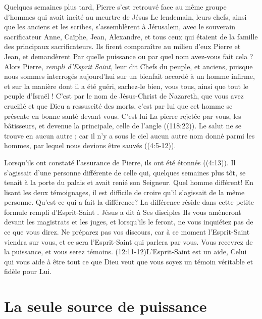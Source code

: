 Quelques semaines plus tard, Pierre s'est retrouvé face au même groupe
 d'hommes qui avait incité au meurtre de Jésus\frcolon{}
 \Og Le lendemain, leurs chefs, ainsi que les anciens et les scribes,
 s'assemblèrent à Jérusalem, avec le souverain sacrificateur Anne,
 Caïphe, Jean, Ale\-xandre, et tous ceux qui étaient de la famille
 des principaux sacrificateurs. Ils firent comparaître au milieu d'eux
 Pierre et Jean, et demandèrent\frcolon{} Par quelle puissance ou par quel nom
 avez-vous fait cela ? Alors Pierre, \emph{rempli d'Esprit Saint}, leur dit\frcolon{}
 Chefs du peuple, et anciens, puisque nous sommes interrogés aujourd'hui
 sur un bienfait accordé à un homme infirme, et sur la manière
 dont il a été guéri, sachez-le bien, vous tous, ainsi que tout le peuple
 d'Israël ! C'est par le nom de Jésus-Christ de Nazareth, que vous avez
 crucifié et que Dieu a ressuscité des morts, c'est par lui que cet homme
 se présente en bonne santé devant vous. C'est lui\frcolon{} \Og La pierre rejetée
 par vous, les bâtisseurs, et devenue la principale, celle de l'angle \Fg{}
 ((118:22)).
 Le salut ne se trouve en aucun autre ; car il n'y a sous le ciel aucun
 autre nom donné parmi les hommes, par lequel nous devions être
 sauvés \Fg{} ((4:5-12)).

Lorsqu'ils ont constaté l'assurance de Pierre, ils ont été étonnés
 ((4:13)).
 Il s'agissait d'une personne différente
 de celle qui, quelques semaines plus tôt, se tenait à la porte du palais
 et avait renié son Seigneur. Quel homme différent!
 En lisant les deux témoignages, il est difficile de croire
 qu'il s'agissait de la même personne. Qu'est-ce qui a fait la différence?
 La différence réside dans cette petite formule\frcolon{}
 \Og rempli d'Esprit-Saint \Fg{}. Jésus a dit à Ses disciples\frcolon{}
 \Og Ils vous amèneront devant les magistrats et les juges,
 et lorsqu'ils le feront, ne vous inquiétez pas de ce que vous direz.
 Ne préparez pas vos discours, car à ce moment l'Esprit-Saint viendra
 sur vous, et ce sera l'Esprit-Saint qui parlera par vous.
 Vous recevrez de la puissance, et vous serez témoins. \Fg{}
 (12:11-12)L'Esprit-Saint est un aide,
 Celui qui vous aide à être tout ce que Dieu
 veut que vous soyez\frcolon{} un témoin véritable et fidèle pour Lui.


\section{La seule source de puissance}

